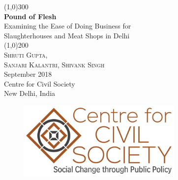 \documentclass[a4paper, 12pt]{article}
\begin{document}
\begin{titlepage}
\begin{center}
\line(1,0){300}\\
[0.25in]
\huge{\bfseries \textcolor{CCSbrown} {Pound of Flesh }} \\
[0.5cm]
\large {Examining the Ease of Doing Business for \\ Slaughterhouses and Meat Shops in Delhi} \\
\line(1,0){200}\\
[1in]
\textsc{\huge Shruti Gupta, \\ Sanjari Kalantri, Shivank Singh} \\
[1.5cm]
{\Large September 2018} \\
[2.0cm]
{\LARGE Centre for Civil Society} \\
[0.1mm]
{\Large New Delhi, India} \\
[2.0cm]
\begin{figure}[H]
\centering
\includegraphics[height = 1.5in]{CCSlogo.jpg}
\end{figure}
\end{center}
\end{titlepage}
\tableofcontents
\newpage
{}
\end{document}
